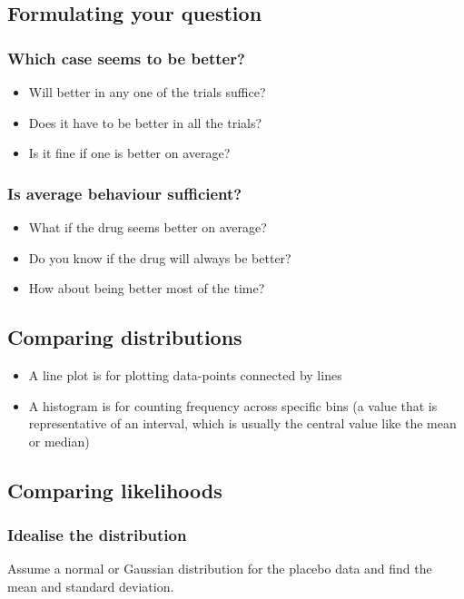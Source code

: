 \documentclass[11pt]{article}
\begin{document}
\subsection{Formulating your question}
\label{sec:orgb40f0dd}

\subsubsection{Which case seems to be better?}
\label{sec:orgc316ade}
\begin{itemize}
\item Will better in any one of the trials suffice?
\item Does it have to be better in all the trials?
\item Is it fine if one is better on average?
\end{itemize}
\subsubsection{Is average behaviour sufficient?}
\label{sec:org2dc4280}
\begin{itemize}
\item What if the drug seems better on average?
\item Do you know if the drug will always be better?
\item How about being better most of the time?
\end{itemize}
\subsection{Comparing distributions}
\label{sec:orgae80c76}
\begin{itemize}
\item A line plot is for plotting data-points connected by lines
\item A histogram is for counting frequency across specific bins (a value that is representative of an interval, which is usually the central value like the mean or median)
\end{itemize}
\subsection{Comparing likelihoods}
\label{sec:org1bef0e5}

\subsubsection{Idealise the distribution}
\label{sec:orgd6f041f}
Assume a normal or Gaussian distribution for the placebo data and find the mean and standard deviation.
\end{document}
